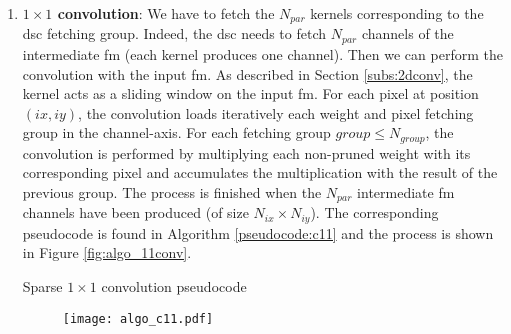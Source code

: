 \begin{enumerate}
    \item \textbf{$1 \times 1$ convolution}: We have to fetch the $N_{par}$ kernels corresponding to the \acrshort{dsc} fetching group. Indeed, the \acrshort{dsc} needs to fetch $N_{par}$ channels of the intermediate \acrshort{fm} (each kernel produces one channel). Then we can perform the convolution with the input \acrshort{fm}. As described in Section \ref{subs:2dconv}, the kernel acts as a sliding window on the input \acrshort{fm}. For each pixel at position $(ix, iy)$, the convolution loads iteratively each weight and pixel fetching group in the channel-axis. For each fetching group $group \leq N_{group}$, the convolution is performed by multiplying each non-pruned weight with its corresponding pixel and accumulates the multiplication with the result of the previous group. The process is finished when the $N_{par}$ intermediate \acrshort{fm} channels have been produced (of size $N_{ix} \times N_{iy}$). The corresponding pseudocode is found in Algorithm \ref{pseudocode:c11} and the process is shown in Figure \ref{fig:algo_11conv}.
    \begin{algorithm}
        \centering
        \begin{algorithmic}
             
                 
                     
                         
                             
                            \EndFor
                        \EndFor
                    \EndFor
                \EndFor
            \EndFor
        \end{algorithmic}
        \caption{Sparse $1 \times 1$ convolution pseudocode}
        \label{pseudocode:c11}
    \end{algorithm}
    \begin{figure}
        \centering
        \texttt{[image: algo\_c11.pdf]}

\end{figure}
\end{enumerate}
